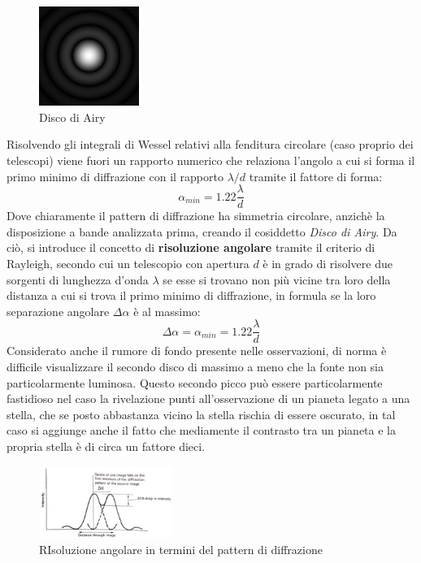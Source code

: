 \documentclass[a4paper,twoside,openany,notitlepage]{book}
\theoremstyle{definition}
\theoremstyle{plain}
\begin{document}
\begin{figure}
	\vspace{-5pt}
	\centering
	\includegraphics[width=0.29\textwidth]{Immagini/Capitolo2/Disco_Airy.PNG}
	\caption*{Disco di Airy}
	\vspace{-12pt}
\end{figure}

Risolvendo gli integrali di Wessel relativi alla fenditura circolare (caso proprio dei telescopi) viene fuori un rapporto numerico che relaziona l'angolo a cui si forma il primo minimo di diffrazione con il rapporto $\lambda/d$ tramite il fattore di forma:
\begin{equation*}
	\alpha_{min}=1.22\frac{\lambda}{d}
\end{equation*}
Dove chiaramente il pattern di diffrazione ha simmetria circolare, anzichè la disposizione a bande analizzata prima, creando il cosiddetto \textit{Disco di Airy}. Da ciò, si introduce il concetto di \textbf{risoluzione angolare} tramite il criterio di Rayleigh, secondo cui un telescopio con apertura $d$ è in grado di risolvere due sorgenti di lunghezza d'onda $\lambda$ se esse si trovano non più vicine tra loro della distanza a cui si trova il primo minimo di diffrazione, in formula se la loro separazione angolare $\Delta\alpha$ è al massimo:
\begin{equation*}
	\Delta\alpha = \alpha_{min} = 1.22\frac{\lambda}{d}
\end{equation*}
Considerato anche il rumore di fondo presente nelle osservazioni, di norma è difficile visualizzare il secondo disco di massimo a meno che la fonte non sia particolarmente luminosa. Questo secondo picco può essere particolarmente fastidioso nel caso la rivelazione punti all'osservazione di un pianeta legato a una stella, che se posto abbastanza vicino la stella rischia di essere oscurato, in tal caso si aggiunge anche il fatto che mediamente il contrasto tra un pianeta e la propria stella è di circa un fattore dieci. 

\begin{figure}
	\vspace{-10pt}
	\centering
	\includegraphics[width=0.39\textwidth]{Immagini/Capitolo2/Risoluzione_angolare.PNG}
	\caption*{RIsoluzione angolare in termini del pattern di diffrazione}
	\vspace{-5pt}
\end{figure}
\end{document}
